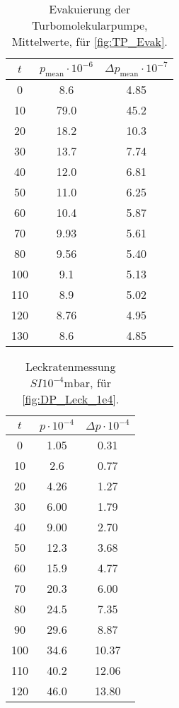\begin{table}[H]
    \centering
    \caption{Evakuierung der Turbomolekularpumpe, Mittelwerte, für  \autoref{fig:TP_Evak}.}
    \label{tab:TP_evak_mittelwert}
    \begin{tabular}{c c c}
        \toprule
        {$t$} & {$p_\text{mean} \cdot 10^{-6}$} & {$\Delta p_\text{mean} \cdot 10^{-7}$}\\
        \midrule
        0   & 8.6& 4.85  \\
        10  & 79.0 & 45.2  \\
        20  & 18.2 & 10.3\\
        30  & 13.7 & 7.74\\
        40  & 12.0 & 6.81\\
        50  & 11.0 & 6.25\\
        60  & 10.4 & 5.87\\
        70  & 9.93 & 5.61\\
        80  & 9.56& 5.40 \\
        100 & 9.1& 5.13  \\
        110 & 8.9& 5.02  \\
        120 & 8.76 & 4.95\\ 
        130 & 8.6& 4.85  \\
        \bottomrule
    \end{tabular}
\end{table}

\begin{table}[H]
    \centering
    \caption{Leckratenmessung $SI{10^{-4}} \si{\milli\bar}$, für  \autoref{fig:DP_Leck_1e4}.}
    \label{tab:}
    \begin{tabular}{c c c}
        \toprule
        {$t$} & {$p \cdot 10^{-4}$} & {$\Delta p \cdot 10^{-4}$} \\
        \midrule
        0 &   1.05 & 0.31\\
        10 &  2.6 & 0.77\\
        20 &  4.26 & 1.27\\
        30 &  6.00 & 1.79\\
        40 &  9.00 & 2.70\\
        50 &  12.3 & 3.68\\
        60 &  15.9 & 4.77\\
        70 &  20.3 & 6.00\\
        80 &  24.5 & 7.35\\
        90 &  29.6 & 8.87\\
        100 & 34.6 & 10.37\\
        110 & 40.2 & 12.06\\
        120 & 46.0 & 13.80\\
        \bottomrule
    \end{tabular}
\end{table}

